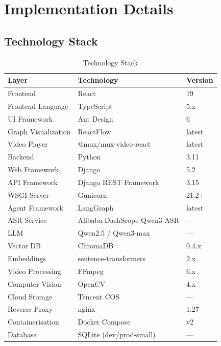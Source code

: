 \section{Implementation Details}
\label{sec:implementation}

\subsection{Technology Stack}

\begin{table}[H]
    \centering
    \caption{Technology Stack}
    \begin{tabular}{@{}lll@{}}
        \toprule
        \textbf{Layer} & \textbf{Technology} & \textbf{Version} \\ \midrule
        Frontend & React & 19 \\
        Frontend Language & TypeScript & 5.x \\
        UI Framework & Ant Design & 6 \\
        Graph Visualization & ReactFlow & latest \\
        Video Player & @mux/mux-video-react & latest \\
        Backend & Python & 3.11 \\
        Web Framework & Django & 5.2 \\
        API Framework & Django REST Framework & 3.15 \\
        WSGI Server & Gunicorn & 21.2+ \\
        Agent Framework & LangGraph & latest \\
        ASR Service & Alibaba DashScope Qwen3-ASR & --- \\
        LLM & Qwen2.5 / Qwen3-max & --- \\
        Vector DB & ChromaDB & 0.4.x \\
        Embeddings & sentence-transformers & 2.x \\
        Video Processing & FFmpeg & 6.x \\
        Computer Vision & OpenCV & 4.x \\
        Cloud Storage & Tencent COS & --- \\
        Reverse Proxy & nginx & 1.27 \\
        Containerisation & Docker Compose & v2 \\
        Database & SQLite (dev/prod-small) & --- \\ \bottomrule
    \end{tabular}
\end{table}

